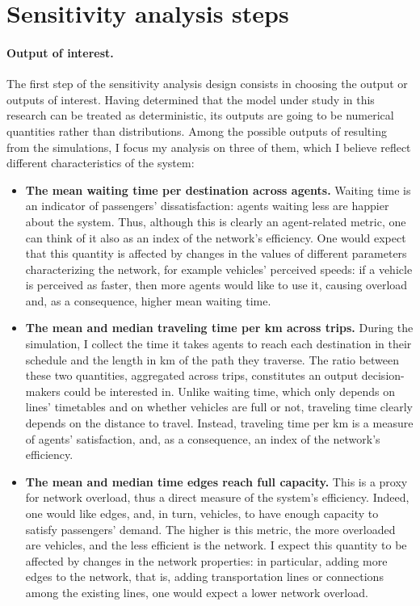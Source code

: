 
\section{Sensitivity analysis steps} \label{sec:ch4_steps}

\paragraph{Output of interest.}
The first step of the sensitivity analysis design consists in choosing the output or outputs of interest. Having determined that the model under study in this research can be treated as deterministic, its outputs are going to be numerical quantities rather than distributions. Among the possible outputs of resulting from the simulations, I focus my analysis on three of them, which I believe reflect different characteristics of the system:
\begin{itemize}
    \item \textbf{The mean waiting time per destination across agents.} Waiting time is an indicator of passengers' dissatisfaction: agents waiting less are happier about the system. Thus, although this is clearly an agent-related metric, one can think of it also as an index of the network's efficiency. One would expect that this quantity is affected by changes in the values of different parameters characterizing the network, for example vehicles' perceived speeds: if a vehicle is perceived as faster, then more agents would like to use it, causing overload and, as a consequence, higher mean waiting time. 
    \item \textbf{The mean and median traveling time per km across trips.} During the simulation, I collect the time it takes agents to reach each destination in their schedule and the length in km of the path they traverse. The ratio between these two quantities, aggregated across trips, constitutes an output decision-makers could be interested in. Unlike waiting time, which only depends on lines' timetables and on whether vehicles are full or not, traveling time clearly depends on the distance to travel. Instead, traveling time per km is a measure of agents' satisfaction, and, as a consequence, an index of the network's efficiency.
    \item \textbf{The mean and median time edges reach full capacity.} This is a proxy for network overload, thus a direct measure of the system's efficiency. Indeed, one would like edges, and, in turn, vehicles, to have enough capacity to satisfy passengers' demand. The higher is this metric, the more overloaded are vehicles, and the less efficient is the network. I expect this quantity to be affected by changes in the network properties: in particular, adding more edges to the network, that is, adding transportation lines or connections among the existing lines, one would expect a lower network overload.
\end{itemize}
